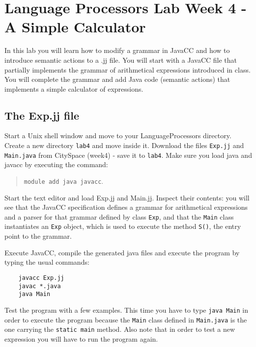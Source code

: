 \documentclass{article}
\begin{document}
\thispagestyle{empty}

\newcommand{\negra}[1]{\textbf{#1}}

\section*{Language Processors Lab Week 4 - A Simple Calculator }

\medskip\noindent In this lab you will learn how to modify a grammar in JavaCC and how to introduce semantic actions to a .jj file. You will start with a JavaCC file that partially implements the grammar of arithmetical expressions introduced in class. You will complete the grammar and add Java code (semantic actions) that implements a simple calculator of expressions. 

\subsection*{The Exp.jj file}

Start a Unix shell window and move to your LanguageProcessors directory. Create a new directory {\tt lab4} and move inside it. Download the files {\tt Exp.jj} and {\tt Main.java} from CitySpace (week4) - save it to {\tt lab4}. Make sure you load java and javacc by executing the command:

\begin{quote}
{\tt module add java javacc}.
\end{quote}

Start the text editor and load Exp.jj and Main.jj. Inspect their contents: you will see that the JavaCC specification defines a grammar for arithmetical expressions and a parser for that grammar defined by class {\tt Exp}, and that the {\tt Main} class instantiates an {\tt Exp} object, which is used to execute the method {\tt S()}, the entry point to the grammar.

Execute JavaCC, compile the generated java files and execute the program by typing the usual commands:

\begin{verbatim}
    javacc Exp.jj
    javac *.java
    java Main
\end{verbatim}

Test the program with a few examples. This time you have to type {\tt java Main} in order to execute the program because the {\tt Main} class defined in {\tt Main.java} is the one carrying the {\tt static main} method. Also note that in order to test a new expression you will have to run the program again. 
\end{document}
